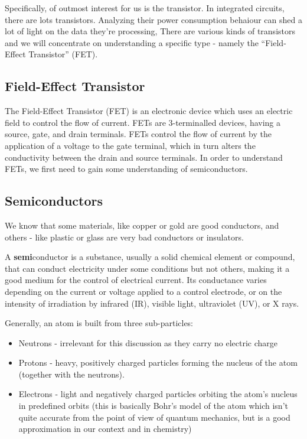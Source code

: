 Specifically, of outmost interest for us is the transistor. 
In integrated circuits, there are lots transistors. Analyzing their power consumption behaiour can
shed a lot of light on the data they're processing,
There are various kinds of transistors and we will concentrate on understanding a
specific type - namely the ``Field-Effect Transistor'' (FET).

\subsection{Field-Effect Transistor}

The Field-Effect Transistor (FET) is an electronic device which uses an electric
field to control the flow of current. FETs are 3-terminalled devices, having a
source, gate, and drain terminals. FETs control the flow of current by the
application of a voltage to the gate terminal, which in turn alters the
conductivity between the drain and source terminals. In order to understand FETs,
we first need to gain some understanding of semiconductors.

\subsection{Semiconductors}

We know that some materials, like copper or gold are good conductors, and others - like plastic or glass are very bad conductors or insulators. 

A \textbf{semi}conductor is a substance, usually a solid chemical element or compound,
that can conduct electricity under some conditions but not others, making it a
good medium for the control of electrical current. Its conductance varies
depending on the current or voltage applied to a control electrode, or on the
intensity of irradiation by infrared (IR), visible light, ultraviolet (UV), or X
rays.

Generally, an atom is built from three sub-particles:
\begin{itemize}
    \item Neutrons - irrelevant for this discussion as they carry no electric charge
    \item Protons - heavy, positively charged particles forming the nucleus of the atom (together with the neutrons).
    \item Electrons - light and negatively charged particles orbiting the atom's nucleus in predefined orbits (this is basically Bohr's model of the atom which isn't quite accurate from the point of view of quantum mechanics, but is a good approximation in our context and in chemistry)
\end{itemize}

